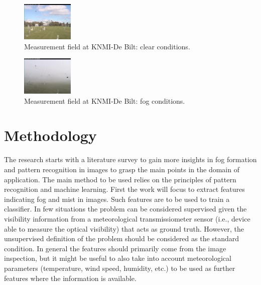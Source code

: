 \documentclass[conference]{IEEEtran}
\begin{document}
		\begin{figure}[ht]
			\centering
			\includegraphics[width=0.22\textwidth]{Meetterrein_20151009_1110.jpg}	
			\caption{Measurement field at KNMI-De Bilt: clear conditions.}
			\label{fig:clear}
		\end{figure}
		
		
				\begin{figure}[ht]
			\centering
			\includegraphics[width=0.22\textwidth]{Meetterrein_20151009_0800.jpg}	
			\caption{Measurement field at KNMI-De Bilt: fog conditions.}
			\label{fig:fog}
		\end{figure}

\section{Methodology}
The research starts with a literature survey to gain more insights in fog formation and pattern recognition in images to grasp the main points in the domain of application.
The main method to be used relies on the principles of pattern recognition and machine learning. 
First the work will focus to extract features indicating fog and mist in images. Such features are to be used to train a classifier. 
In few situations the problem can be considered supervised given the visibility information from a 
meteorological transmissiometer sensor (i.e., device able to measure the optical visibility) that acts as ground truth. However, the 
unsupervised definition of the problem should be considered as the standard condition. In general the features should primarily come from the image inspection, but it might be useful to also take into account meteorological parameters 
(temperature, wind speed, humidity, etc.) to be used as further features where
the information is available.

\end{document}
